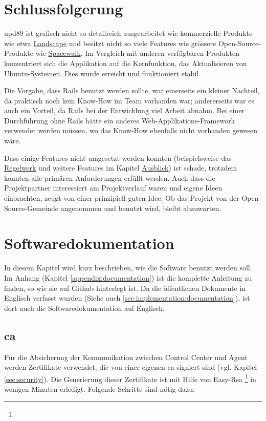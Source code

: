 \section{Schlussfolgerung}
\label{conclusion}

\gls{upd89} ist grafisch nicht so detailreich ausgearbeitet wie kommerzielle Produkte wie etwa \hyperref[sec:analysis:competition:landscape]{Landscape} und besitzt nicht so viele Features wie grössere Open-Source-Produkte wie \hyperref[sec:analysis:competition:spacewalk]{Spacewalk}. Im Vergleich mit anderen verfügbaren Produkten konzentriert sich die Applikation auf die Kernfunktion, das Aktualisieren von Ubuntu-Systemen. Dies wurde erreicht und funktioniert stabil.

Die Vorgabe, dass Rails benutzt werden sollte, war einerseits ein kleiner Nachteil, da praktisch noch kein Know-How im Team vorhanden war; andererseits war es auch ein Vorteil, da Rails bei der Entwicklung viel Arbeit abnahm. Bei einer Durchführung ohne Rails hätte ein anderes Web-Applikations-Framework verwendet werden müssen, wo das Know-How ebenfalls nicht vorhanden gewesen wäre.

Dass einige Features nicht umgesetzt werden konnten (beispielsweise das \hyperref[sec:ausblick:regelwerk]{Regelwerk} und weitere Features im Kapitel \hyperref[sec:ausblick]{Ausblick}) ist schade, trotzdem konnten alle primären Anforderungen erfüllt werden. Auch dass die Projektpartner interessiert am Projektverlauf waren und eigene Ideen einbrachten, zeugt von einer prinzipiell guten Idee. Ob das Projekt von der Open-Source-Gemeinde angenommen und benutzt wird, bleibt abzuwarten.

\section{Softwaredokumentation} \label{documentation}

In diesem Kapitel wird kurz beschrieben, wie die Software benutzt werden soll. Im Anhang (Kapitel \ref{appendix:documentation}) ist die komplette Anleitung zu finden, so wie sie auf Github hinterlegt ist. Da die öffentlichen Dokumente in Englisch verfasst wurden (Siehe auch \ref{sec:implementation:documentation}), ist dort auch die Softwaredokumentation auf Englisch.

\subsection*{\gls{ca}}
Für die Absicherung der Kommunikation zwischen Control Center und Agent werden Zertifikate verwendet, die von einer eigenen \gls{ca} signiert sind (vgl. Kapitel \ref{sec:security}). Die Generierung dieser Zertifikate ist mit Hilfe von Easy-Rsa \footnote{} in wenigen Minuten erledigt. Folgende Schritte sind nötig dazu:

